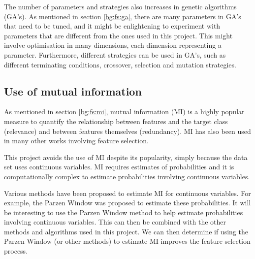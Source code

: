 \documentclass[12pt, twoside, a4paper]{report}
\begin{document}
The number of parameters and strategies also increases in genetic algorithms (GA's). As mentioned in section \ref{bg:fs:ga}, there are many parameters in GA's that need to be tuned, and it might be enlightening to experiment with parameters that are different from the ones used in this project. This might involve optimisation in many dimensions, each dimension representing a parameter. Furthermore, different strategies can be used in GA's, such as different terminating conditions, crossover, selection and mutation strategies.


\subsection{Use of mutual information}
As mentioned in section \ref{bg:fs:mi}, mutual information (MI) is a highly popular measure to quantify the relationship between features and the target class (relevance) and between features themselves (redundancy). MI has also been used in many other works involving feature selection.

This project avoids the use of MI despite its popularity, simply because the data set uses continuous variables. MI requires estimates of probabilities and it is computationally complex to estimate probabilities involving continuous variables.

Various methods have been proposed to estimate MI for continuous variables. For example, the Parzen Window \cite{RefWorks:183} was proposed to estimate these probabilities. It will be interesting to use the Parzen Window method to help estimate probabilities involving continuous variables. This can then be combined with the other methods and algorithms used in this project. We can then determine if using the Parzen Window (or other methods) to estimate MI improves the feature selection process.


\newpage

\singlespacing
{}


\end{document}
